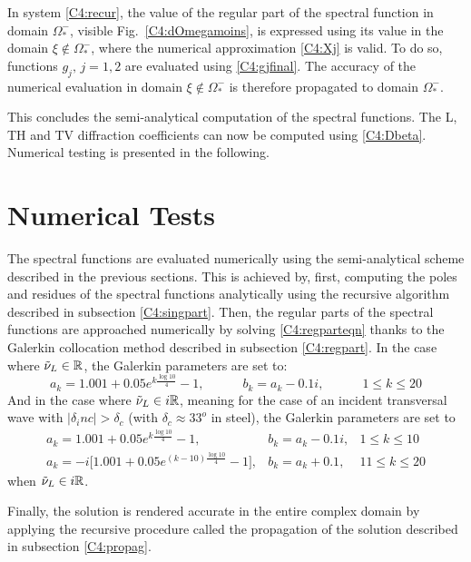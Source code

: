 In system \eqref{C4:recur}, the value of the regular part of the spectral function in domain $\Omega_*^-$, visible Fig.~\ref{C4:dOmegamoins}, is expressed using its value in the domain $\xi \notin \Omega_*^-$, where the numerical approximation \eqref{C4:Xj} is valid. To do so, functions $g_j,\, j=1,2$ are evaluated using \eqref{C4:gjfinal}. The accuracy of the numerical evaluation in domain $\xi \notin \Omega_*^-$ is therefore propagated to domain $\Omega_*^-$. 

This concludes the semi-analytical computation of the spectral functions. The L, TH and TV diffraction coefficients can now be computed using \eqref{C4:Dbeta}. Numerical testing is presented in the following. 

\section{Numerical Tests}
The spectral functions are evaluated numerically using the semi-analytical scheme described in the previous sections. This is achieved by, first, computing the poles and residues of the spectral functions analytically using the recursive algorithm described in subsection \ref{C4:singpart}. Then, the regular parts of the spectral functions are approached numerically by solving \eqref{C4:regparteqn} thanks to the Galerkin collocation method described in subsection \ref{C4:regpart}. In the case where $\tilde{\nu}_L \in \mathbb{R}$, the Galerkin parameters are set to:
\begin{equation}
a_k=1.001+0.05e^{k\frac{\log 10}{4}}-1, \hspace{3em} b_k=a_k-0.1i, \hspace{3em} 1\leq k\leq20
\end{equation}
And in the case where $\tilde{\nu}_L \in i\mathbb{R}$, meaning for the case of an incident transversal wave with $|\delta_inc|>\delta_c$ (with $\delta_c \approx 33^o$ in steel), the Galerkin parameters are set to
\begin{equation}
\begin{matrix}
a_k=1.001+0.05e^{k\frac{\log 10}{4}}-1, & b_k=a_k-0.1i, & 1\leq k\leq10\\
a_k=-i\lbrack 1.001+0.05e^{(k-10)\frac{\log 10}{4}}-1\rbrack, & b_k=a_k+0.1, & 11\leq k\leq20
\end{matrix}
\end{equation}
when $\tilde{\nu}_L \in i\mathbb{R}$.

Finally, the solution is rendered accurate in the entire complex domain by applying the recursive procedure called the propagation of the solution described in subsection \ref{C4:propag}.

